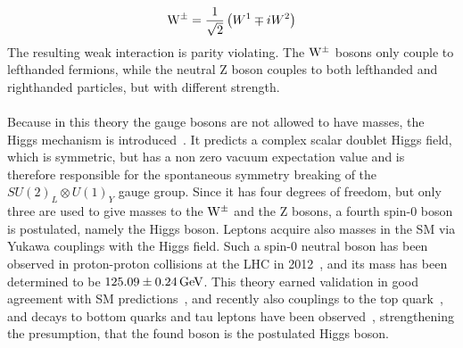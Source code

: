 \begin{equation}
 \mathrm{W}^\pm = \frac{1}{\sqrt{2}}\left(W^1\mp i W^2\right)
\end{equation}
The resulting weak interaction is parity violating. The $\mathrm{W}^\pm$ bosons only couple to lefthanded fermions, while the neutral Z boson couples to both lefthanded and righthanded particles, but with different strength.\\
\\Because in this theory the gauge bosons are not allowed to have masses, the Higgs mechanism is introduced~\cite{Higgs1,Higgs2,Higgs3}. It predicts a complex scalar doublet Higgs field, which is symmetric, but has a non zero vacuum expectation value and is therefore responsible for the spontaneous symmetry breaking of the $ SU(2)_L\otimes U(1)_Y$ gauge group. Since it has four degrees of freedom, but only three are used to give masses to the $\mathrm{W}^\pm$ and the Z bosons, a fourth spin-0 boson is postulated, namely the Higgs boson. Leptons acquire also masses in the SM via Yukawa couplings with the Higgs field.
Such a spin-0 neutral boson has been observed in proton-proton collisions at the LHC in 2012~\cite{HiggsCMS,HiggsATLAS}, and its mass has been determined to be $125.09\pm0.24\,\text{Ge\hspace{-.08em}V}$. This theory earned validation in good agreement with SM predictions~\cite{HiggsPrecise}, and recently also couplings to the top quark~\cite{ttH}, and decays to bottom quarks and tau leptons have been observed~\cite{HiggsTauTau,HiggsBB}, strengthening the presumption, that the found boson is the postulated Higgs boson.



